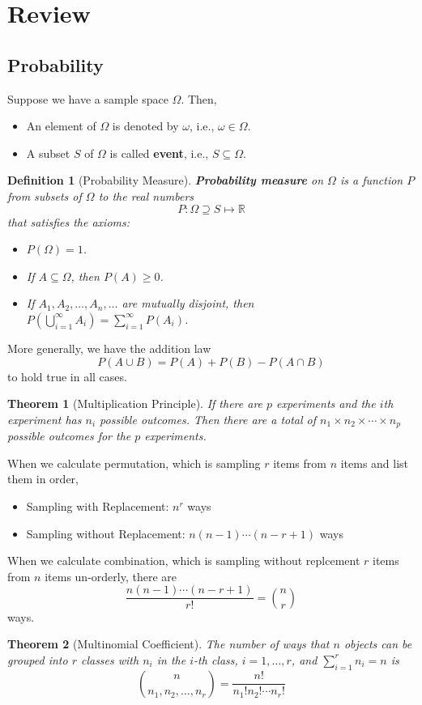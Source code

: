 \documentclass[12pt]{article}
\newtheorem{definition}{Definition}[section]
\newtheorem{theorem}{Theorem}[section]
\theoremstyle{definition}
\begin{document}
\twocolumn
\section{Review}
\subsection{Probability}
Suppose we have a sample space $\Omega$. Then, 
\begin{itemize}
  \item An element of $\Omega$ is denoted by $\omega$, i.e., $\omega \in \Omega$.
  \item A subset $S$ of $\Omega$ is called \textbf{event}, i.e., $S\subseteq \Omega$.
\end{itemize}
\begin{definition}[Probability Measure]
\normalfont \textbf{Probability measure} on $\Omega$ is a function $P$ from subsets of $\Omega$ to the real numbers
\[
P:\Omega \supseteq S \mapsto \mathbb{R}
\]
that satisfies the axioms:
\begin{itemize}
  \item $P(\Omega) = 1$.
  \item If $A\subseteq \Omega$, then $P(A)\geq 0$.
  \item If $A_1, A_2, \ldots, A_n,\ldots$ are mutually disjoint, then $P\left(\bigcup_{i=1}^\infty A_i\right) = \sum_{i=1}^\infty P(A_i)$.
\end{itemize}
\end{definition}
More generally, we have the addition law
\[
P(A\cup B) = P(A)+P(B)-P(A\cap B)
\]
to hold true in all cases.
\begin{theorem}[Multiplication Principle]
\normalfont If there are $p$ experiments and the $i$th experiment has $n_i$ possible outcomes. Then there are a total of $n_1\times n_2\times \cdots\times n_p$ possible outcomes for the $p$ experiments.
\end{theorem}
When we calculate permutation, which is sampling $r$ items from $n$ items and list them in order, 
\begin{itemize}
  \item Sampling with Replacement: $n^r$ ways
  \item Sampling without Replacement: $n(n-1)\cdots(n-r+1)$ ways
\end{itemize}
When we calculate combination, which is sampling without replcement $r$ items from $n$ items un-orderly,
there are
\[
\frac{n(n-1)\cdots(n-r+1)}{r!}=\binom{n}{r}
\]
ways.
\begin{theorem}[Multinomial Coefficient]
\normalfont The number of ways that $n$ objects can be grouped into $r$ classes with $n_i$ in the $i$-th class, $i=1,\ldots, r$, and $\sum_{i=1}^r n_i=n$ is
\[
\binom{n}{n_1,n_2,\ldots, n_r} = \frac{n!}{n_1!n_2!\cdots n_r!}
\]
\end{theorem}
\end{document}
